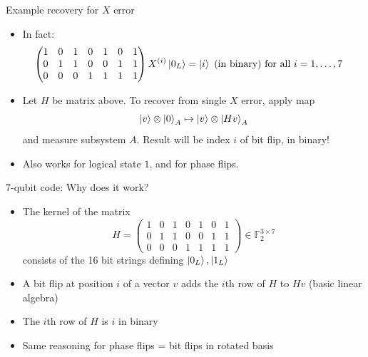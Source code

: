 \documentclass{beamer}
\begin{document}
\begin{frame}{Example recovery for $X$ error}
  \begin{itemize}
  \item In fact:
    \begin{align*}
      \begin{pmatrix}
        1&0&1&0&1&0&1\\
        0&1&1&0&0&1&1\\
        0&0&0&1&1&1&1
      \end{pmatrix}
                     X^{(i)}\left\vert{0_L}\right\rangle &= \left\vert{i}\right\rangle \text{ (in binary) for all } i=1,\dots,7
    \end{align*}
  \item Let $H$ be matrix above. To recover from single $X$ error, apply map
    \begin{equation*}
      \left\vert{v}\right\rangle\otimes\left\vert{0}\right\rangle_A\mapsto\left\vert{v}\right\rangle\otimes\left\vert{Hv}\right\rangle_A
    \end{equation*}
    and measure subsystem $A$. Result will be index $i$ of bit flip, in binary!
  \item Also works for logical state $1$, and for phase flips.
  \end{itemize}
\end{frame}

\begin{frame}{7-qubit code: Why does it work?}
  \begin{itemize}
  \item The kernel of the matrix
    \begin{equation*}
      H=\begin{pmatrix}
        1&0&1&0&1&0&1\\
        0&1&1&0&0&1&1\\
        0&0&0&1&1&1&1
      \end{pmatrix}\in\mathbb{F}_2^{3\times 7}
    \end{equation*}
    consists of the 16 bit strings defining $\left\vert{0_L}\right\rangle,\left\vert{1_L}\right\rangle$
  \item A bit flip at position $i$ of a vector $v$ adds the $i$th row of $H$ to $Hv$ (basic linear algebra)
  \item The $i$th row of $H$ is $i$ in binary
  \item Same reasoning for phase flips = bit flips in rotated basis
  \end{itemize}
\end{frame}
\end{document}
